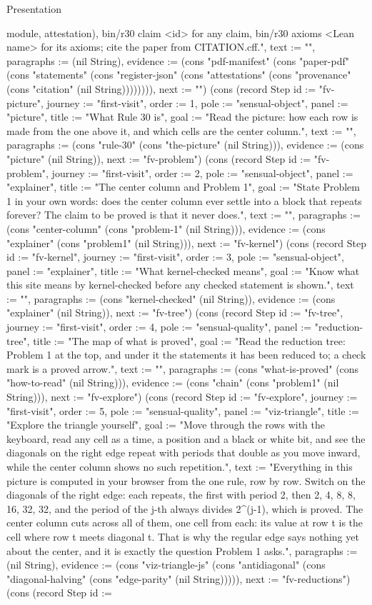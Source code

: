 \begin{lexlean}{Presentation}
\begin{semanticmodule}
{module, attestation), bin/r30 claim <id> for any claim, bin/r30 axioms <Lean name> for its axioms; cite the paper from CITATION.cff.", text := "", paragraphs := (nil String), evidence := (cons "pdf-manifest" (cons "paper-pdf" (cons "statements" (cons "register-json" (cons "attestations" (cons "provenance" (cons "citation" (nil String)))))))), next := ""}) (cons (record Step {id := "fv-picture", journey := "first-visit", order := 1, pole := "sensual-object", panel := "picture", title := "What Rule 30 is", goal := "Read the picture: how each row is made from the one above it, and which cells are the center column.", text := "", paragraphs := (cons "rule-30" (cons "the-picture" (nil String))), evidence := (cons "picture" (nil String)), next := "fv-problem"}) (cons (record Step {id := "fv-problem", journey := "first-visit", order := 2, pole := "sensual-object", panel := "explainer", title := "The center column and Problem 1", goal := "State Problem 1 in your own words: does the center column ever settle into a block that repeats forever? The claim to be proved is that it never does.", text := "", paragraphs := (cons "center-column" (cons "problem-1" (nil String))), evidence := (cons "explainer" (cons "problem1" (nil String))), next := "fv-kernel"}) (cons (record Step {id := "fv-kernel", journey := "first-visit", order := 3, pole := "sensual-object", panel := "explainer", title := "What kernel-checked means", goal := "Know what this site means by kernel-checked before any checked statement is shown.", text := "", paragraphs := (cons "kernel-checked" (nil String)), evidence := (cons "explainer" (nil String)), next := "fv-tree"}) (cons (record Step {id := "fv-tree", journey := "first-visit", order := 4, pole := "sensual-quality", panel := "reduction-tree", title := "The map of what is proved", goal := "Read the reduction tree: Problem 1 at the top, and under it the statements it has been reduced to; a check mark is a proved arrow.", text := "", paragraphs := (cons "what-is-proved" (cons "how-to-read" (nil String))), evidence := (cons "chain" (cons "problem1" (nil String))), next := "fv-explore"}) (cons (record Step {id := "fv-explore", journey := "first-visit", order := 5, pole := "sensual-quality", panel := "viz-triangle", title := "Explore the triangle yourself", goal := "Move through the rows with the keyboard, read any cell as a time, a position and a black or white bit, and see the diagonals on the right edge repeat with periods that double as you move inward, while the center column shows no such repetition.", text := "Everything in this picture is computed in your browser from the one rule, row by row. Switch on the diagonals of the right edge: each repeats, the first with period 2, then 2, 4, 8, 8, 16, 32, 32, and the period of the j-th always divides 2^(j-1), which is proved. The center column cuts across all of them, one cell from each: its value at row t is the cell where row t meets diagonal t. That is why the regular edge says nothing yet about the center, and it is exactly the question Problem 1 asks.", paragraphs := (nil String), evidence := (cons "viz-triangle-js" (cons "antidiagonal" (cons "diagonal-halving" (cons "edge-parity" (nil String))))), next := "fv-reductions"}) (cons (record Step {id := }
\end{semanticmodule}
\end{lexlean}
